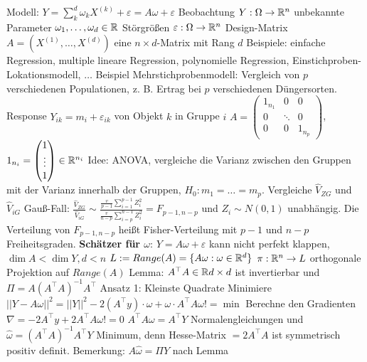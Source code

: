\begin{outline}
    \1 Modell: $Y=\sum^d_k \omega_k X^{(k)}+ \varepsilon = A\omega + \varepsilon$
        \2 Beobachtung $Y:\Omega \rightarrow \mathbb{R}^n$
        \2 unbekannte Parameter $\omega_1,\ldots,\omega_d \in \mathbb{R}$
        \2 Störgrößen $\varepsilon : \Omega\rightarrow\mathbb{R}^n$
        \2 Design-Matrix $A=(X^{(1)}, \ldots, X^{(d)})$ eine $n\times d$-Matrix mit Rang $d$
    \1 Beispiele: einfache Regression, multiple lineare Regression, polynomielle Regression, Einstichproben-Lokationsmodell, $\ldots$
    \1 Beispiel Mehrstichprobenmodell: Vergleich von $p$ verschiedenen Populationen, z. B. Ertrag bei $p$ verschiedenen Düngersorten.
        \2 Response $Y_{ik}=m_i + \varepsilon_{ik}$ von Objekt $k$ in Gruppe $i$
        \2 $A=\begin{pmatrix}
            1_{n_1} & 0 & 0\\
            0 & \ddots & 0\\
            0 & 0 & 1_{n_p}
        \end{pmatrix}$, $1_{n_i}=\begin{pmatrix}
            1 \\
            \vdots \\
            1
        \end{pmatrix} \in \mathbb{R}^{n_i}$
        \2 Idee: ANOVA, vergleiche die Varianz zwischen den Gruppen mit der Varianz innerhalb der Gruppen, $H_0 : m_1 = \ldots = m_p$. 
        \2 Vergleiche $\hat{V}_{ZG}$ und $\hat{V}_{iG}$
        \2 Gauß-Fall: $\frac{\hat{V}_{ZG}}{\hat{V}_{iG}} \sim \frac{\frac{v}{p-1}\sum^{p-1}_{i=1} Z_i^2}{\frac{v}{n-p}\sum^{n-1}_{i=p}Z_i^2} = F_{p-1,n-p}$ und $Z_i\sim N(0,1)$ unabhängig.
        \2 Die Verteilung von $F_{p-1,n-p}$ heißt Fisher-Verteilung mit $p-1$ und $n-p$ Freiheitsgraden.
\0 \textbf{Schätzer für $\omega$}: $Y=A\omega + \varepsilon$ 
    \1 kann nicht perfekt klappen, $\dim A < \dim Y, d<n$
    \1 $L:=Range(A)= \{A\omega : \omega \in \mathbb{R}^d\}$
    \1 $\pi:\mathbb{R}^n \rightarrow L$ orthogonale Projektion auf $Range(A)$
    \1 Lemma: $A^\top A\in \mathbb{R}{d\times d}$ ist invertierbar und $\Pi = A(A^\top A)^{-1}A^{\top}$
    \1 Ansatz 1: Kleinste Quadrate
        \2 Minimiere $||Y-A\omega||^2=||Y||^2 - 2 (A^\top y)\cdot \omega + \omega \cdot A^\top A \omega != \min$
        \2 Berechne den Gradienten $\nabla = -2A^\top y + 2 A^\top A \omega != 0$
        \2 $A^\top A \omega = A^\top Y$ Normalengleichungen und $\hat{\omega} = (A^\top A)^{-1}A^\top Y$ Minimum, denn Hesse-Matrix $=2A^\top A$ ist symmetrisch positiv definit.
        \2 Bemerkung: $A\hat{\omega}=\Pi Y$ nach Lemma
\end{outline}
